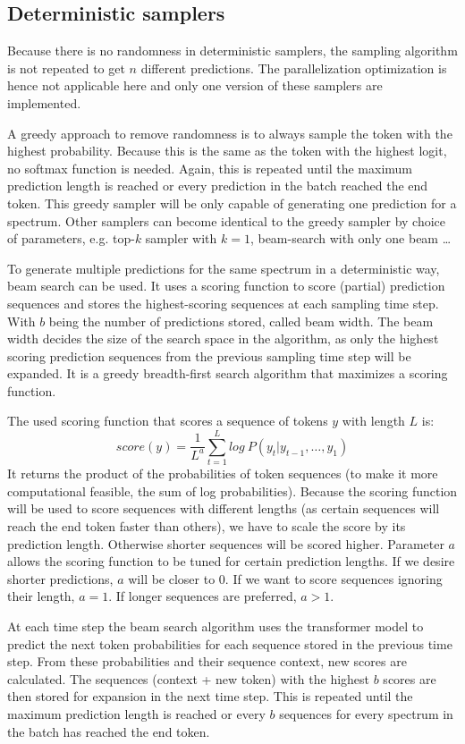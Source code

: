 \subsection{Deterministic samplers}

Because there is no randomness in deterministic samplers, the sampling algorithm is not repeated to get $n$ different predictions. The parallelization optimization is hence not applicable here and only one version of these samplers are implemented.

A greedy approach to remove randomness is to always sample the token with the highest probability. Because this is the same as the token with the highest logit, no softmax function is needed.
Again, this is repeated until the maximum prediction length is reached or every prediction in the batch reached the end token.
This greedy sampler will be only capable of generating one prediction for a spectrum.
Other samplers can become identical to the greedy sampler by choice of parameters, e.g. top-$k$ sampler with $k=1$, beam-search with only one beam \ldots

To generate multiple predictions for the same spectrum in a deterministic way, beam search can be used.
It uses a scoring function to score (partial) prediction sequences and stores the highest-scoring sequences at each sampling time step.
With $b$ being the number of predictions stored, called beam width.
The beam width decides the size of the search space in the algorithm, as only the highest scoring prediction sequences from the previous sampling time step will be expanded.
It is a greedy breadth-first search algorithm that maximizes a scoring function.

The used scoring function that scores a sequence of tokens $y$ with length $L$ is:
\[score(y) = \frac{1}{L^a} \sum\limits_{t=1}^{L}log\ P(y_t | y_{t-1},\dots,y_{1})\]
It returns the product of the probabilities of token sequences (to make it more computational feasible, the sum of log probabilities).
Because the scoring function will be used to score sequences with different lengths (as certain sequences will reach the end token faster than others),
we have to scale the score by its prediction length. Otherwise shorter sequences will be scored higher.
Parameter $a$ allows the scoring function to be tuned for certain prediction lengths.
If we desire shorter predictions, $a$ will be closer to 0.
If we want to score sequences ignoring their length, $a=1$. 
If longer sequences are preferred, $a>1$.

At each time step the beam search algorithm uses the transformer model to predict the next token probabilities for each sequence stored in the previous time step.
From these probabilities and their sequence context, new scores are calculated.
The sequences (context + new token) with the highest $b$ scores are then stored for expansion in the next time step.
This is repeated until the maximum prediction length is reached or every $b$ sequences for every spectrum in the batch has reached the end token.

